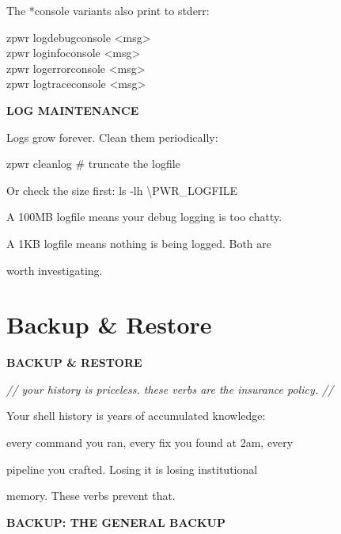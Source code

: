 \documentclass[11pt,a4paper,twoside]{book}
\begin{document}
The *console variants also print to stderr:

\begin{codebox}
zpwr logdebugconsole <msg>\\
zpwr loginfoconsole <msg>\\
zpwr logerrorconsole <msg>\\
zpwr logtraceconsole <msg>\\
\end{codebox}


\vspace{12pt}
{\bfseries\color{neonyellow} LOG MAINTENANCE}\vspace{4pt}

Logs grow forever. Clean them periodically:

\begin{codebox}
zpwr cleanlog                       \# truncate the logfile\\
\end{codebox}

Or check the size first: ls -lh \textbackslash{}PWR\_LOGFILE

A 100MB logfile means your debug logging is too chatty.

A 1KB logfile means nothing is being logged. Both are

worth investigating.


\vspace{16pt}

\section{Backup \& Restore}


\vspace{10pt}
{\large\bfseries\color{neoncyan} BACKUP \& RESTORE}\vspace{6pt}

{\small\itshape\color{dimtext} // your history is priceless. these verbs are the insurance policy. //}

Your shell history is years of accumulated knowledge:

every command you ran, every fix you found at 2am, every

\begin{codebox}
pipeline you crafted. Losing it is losing institutional\\
\end{codebox}

memory. These verbs prevent that.


\vspace{12pt}
{\bfseries\color{neonyellow} BACKUP: THE GENERAL BACKUP}\vspace{4pt}
\end{document}
